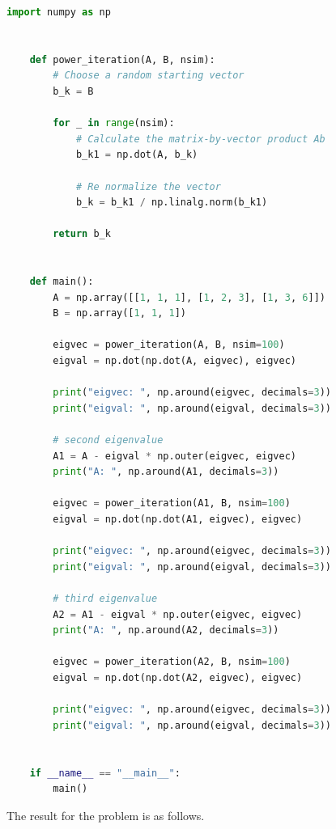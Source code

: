 \documentclass{article}
\begin{document}
\begin{lstlisting}[language=Python]
    import numpy as np


    def power_iteration(A, B, nsim):
        # Choose a random starting vector
        b_k = B
    
        for _ in range(nsim):
            # Calculate the matrix-by-vector product Ab
            b_k1 = np.dot(A, b_k)
    
            # Re normalize the vector
            b_k = b_k1 / np.linalg.norm(b_k1)
    
        return b_k
    
    
    def main():
        A = np.array([[1, 1, 1], [1, 2, 3], [1, 3, 6]])
        B = np.array([1, 1, 1])
    
        eigvec = power_iteration(A, B, nsim=100)
        eigval = np.dot(np.dot(A, eigvec), eigvec)
    
        print("eigvec: ", np.around(eigvec, decimals=3))
        print("eigval: ", np.around(eigval, decimals=3))
    
        # second eigenvalue
        A1 = A - eigval * np.outer(eigvec, eigvec)
        print("A: ", np.around(A1, decimals=3))
    
        eigvec = power_iteration(A1, B, nsim=100)
        eigval = np.dot(np.dot(A1, eigvec), eigvec)
    
        print("eigvec: ", np.around(eigvec, decimals=3))
        print("eigval: ", np.around(eigval, decimals=3))
    
        # third eigenvalue
        A2 = A1 - eigval * np.outer(eigvec, eigvec)
        print("A: ", np.around(A2, decimals=3))
    
        eigvec = power_iteration(A2, B, nsim=100)
        eigval = np.dot(np.dot(A2, eigvec), eigvec)
    
        print("eigvec: ", np.around(eigvec, decimals=3))
        print("eigval: ", np.around(eigval, decimals=3))
    
    
    if __name__ == "__main__":
        main()    
\end{lstlisting}

The result for the problem is as follows.
\end{document}
